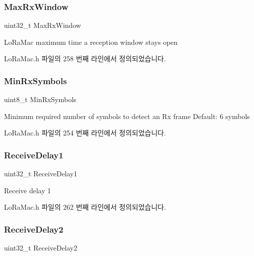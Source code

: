 \subsubsection{\texorpdfstring{Max\+Rx\+Window}{MaxRxWindow}}
{\footnotesize\ttfamily uint32\+\_\+t Max\+Rx\+Window}

Lo\+Ra\+Mac maximum time a reception window stays open 

Lo\+Ra\+Mac.\+h 파일의 258 번째 라인에서 정의되었습니다.

\mbox{\label{structs_lo_ra_mac_params_ab33f97482f9af163d593cf103a2ccf1c}} 
\subsubsection{\texorpdfstring{Min\+Rx\+Symbols}{MinRxSymbols}}
{\footnotesize\ttfamily uint8\+\_\+t Min\+Rx\+Symbols}

Minimum required number of symbols to detect an Rx frame Default\+: 6 symbols 

Lo\+Ra\+Mac.\+h 파일의 254 번째 라인에서 정의되었습니다.

\mbox{\label{structs_lo_ra_mac_params_a426f0e1108ebe3ba1b05c2853c0b0c3a}} 
\subsubsection{\texorpdfstring{Receive\+Delay1}{ReceiveDelay1}}
{\footnotesize\ttfamily uint32\+\_\+t Receive\+Delay1}

Receive delay 1 

Lo\+Ra\+Mac.\+h 파일의 262 번째 라인에서 정의되었습니다.

\mbox{\label{structs_lo_ra_mac_params_a67fbe3fba2eb31f8879ea22674dd50d8}} 
\subsubsection{\texorpdfstring{Receive\+Delay2}{ReceiveDelay2}}
{\footnotesize\ttfamily uint32\+\_\+t Receive\+Delay2}

